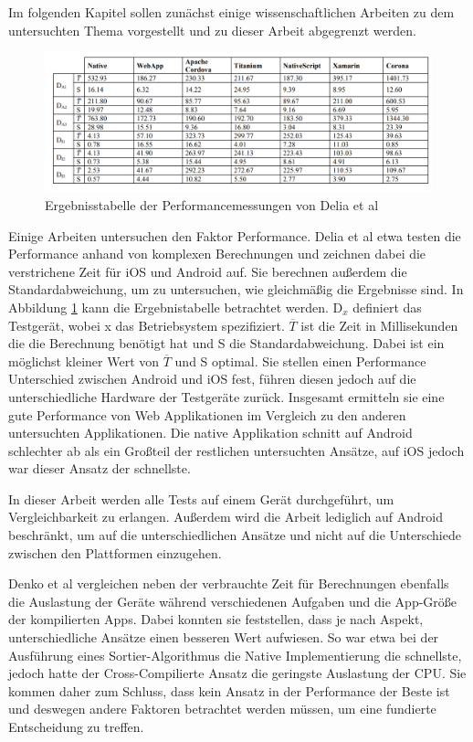 Im folgenden Kapitel sollen zunächst einige wissenschaftlichen Arbeiten zu dem untersuchten Thema vorgestellt und zu dieser Arbeit abgegrenzt werden.

\begin{figure}[ht]
  \centering
  \includegraphics[width=\textwidth,keepaspectratio]{images/IEEE_Delia_Al.png}
  \caption[Ergebnisstabelle der Performancemessungen von Delia et al]{Ergebnisstabelle der Performancemessungen von Delia et al \cite{IEEE_development_classes}}
  \label{fig:result_table_IEEE_related_work}
\end{figure}

Einige Arbeiten untersuchen den Faktor Performance. Delia et al \cite{IEEE_development_classes} etwa testen die Performance anhand von komplexen Berechnungen und zeichnen dabei die verstrichene Zeit für iOS und Android auf. Sie berechnen außerdem die Standardabweichung, um zu untersuchen, wie gleichmäßig die Ergebnisse sind. In Abbildung \ref{fig:result_table_IEEE_related_work} kann die Ergebnistabelle betrachtet werden. D$_x$ definiert das Testgerät, wobei x das Betriebsystem spezifiziert. $\overline T$ ist die Zeit in Millisekunden die die Berechnung benötigt hat und S die Standardabweichung. Dabei ist ein möglichst kleiner Wert von $\overline T$ und S optimal. Sie stellen einen Performance Unterschied zwischen Android und iOS fest, führen diesen jedoch auf die unterschiedliche Hardware der Testgeräte zurück. Insgesamt ermitteln sie eine gute Performance von Web Applikationen im Vergleich zu den anderen untersuchten Applikationen. Die native Applikation schnitt auf Android schlechter ab als ein Großteil der restlichen untersuchten Ansätze, auf iOS jedoch war dieser Ansatz der schnellste.

In dieser Arbeit werden alle Tests auf einem Gerät durchgeführt, um Vergleichbarkeit zu erlangen. Außerdem wird die Arbeit lediglich auf Android beschränkt, um auf die unterschiedlichen Ansätze und nicht auf die Unterschiede zwischen den Plattformen einzugehen.
 
Denko et al \cite{Denko_performance} vergleichen neben der verbrauchte Zeit für Berechnungen ebenfalls die Auslastung der Geräte während verschiedenen Aufgaben und die App-Größe der kompilierten Apps. Dabei konnten sie feststellen, dass je nach Aspekt, unterschiedliche Ansätze einen besseren Wert aufwiesen. So war etwa bei der Ausführung eines Sortier-Algorithmus die Native Implementierung die schnellste, jedoch hatte der Cross-Compilierte Ansatz die geringste Auslastung der CPU. Sie kommen daher zum Schluss, dass kein Ansatz in der Performance der Beste ist und deswegen andere Faktoren betrachtet werden müssen, um eine fundierte Entscheidung zu treffen.

